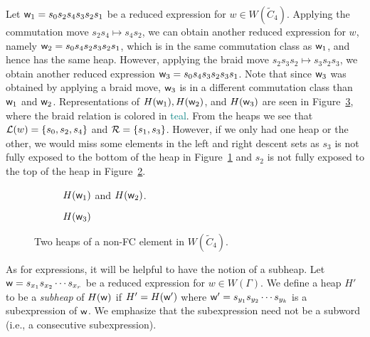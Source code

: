 \begin{example}
Let $\mathsf{w}_1=s_0s_2s_4s_3s_2s_1$ be a reduced expression for $w \in W(\widetilde{C}_4)$. Applying the commutation move $s_2s_4\mapsto s_4s_2$, we can obtain another reduced expression for $w$, namely $\mathsf{w}_2=s_0s_4s_2s_3s_2s_1$, which is in the same commutation class as $\mathsf{w}_1$, and hence has the same heap. However, applying the braid move $s_2s_3s_2 \mapsto s_3s_2s_3$, we obtain another reduced expression $\mathsf{w}_3=s_0s_4s_3s_2s_3s_1$. Note that since $\mathsf{w}_3$ was obtained by applying a braid move, $\mathsf{w}_3$ is in a different commutation class than $\mathsf{w}_1$ and $\mathsf{w}_2$. Representations of $H(\mathsf{w}_1), H(\mathsf{w}_2)$, and $H(\mathsf{w}_3)$ are seen in Figure~\ref{fig:not FC}, where the braid relation is colored in \textcolor{teal}{teal}. From the heaps we see that $\mathcal{L}(w)=\{s_0,s_2,s_4\}$ and $\mathcal{R}=\{s_1,s_3\}$. However, if we only had one heap or the other, we would miss some elements in the left and right descent sets as $s_3$ is not fully exposed to the bottom of the heap in Figure~\ref{fig:notFC2} and $s_2$ is not fully exposed to the top of the heap in Figure~\ref{fig:notFC3}. 

\begin{figure}[h]
\centering
\begin{subfigure}[b]{0.3\textwidth}	
\centering
{}
\caption{$H(\mathsf{w}_1)$ and $H(\mathsf{w}_2)$.}\label{fig:notFC2}
\end{subfigure}
\begin{subfigure}[b]{0.3\textwidth}	
\centering
{}
\caption{$H(\mathsf{w}_3)$}\label{fig:notFC3}
\end{subfigure}
\caption{Two heaps of a non-FC element in $W(\widetilde{C}_4)$.}	
\label{fig:not FC}
\end{figure}
\end{example}

As for expressions, it will be helpful to have the notion of a subheap. Let $\mathsf{w}=s_{x_1}s_{x_2} \cdots s_{x_r}$ be a reduced expression for $w \in W(\Gamma)$. We define a heap $H'$ to be a \emph{subheap} of $H(\mathsf{w})$ if $H'=H(\mathsf{w}')$ where $\mathsf{w}'=s_{y_1}s_{y_2} \cdots s_{y_k}$ is a subexpression of $\mathsf{w}$. We emphasize that the subexpression need not be a subword (i.e., a consecutive subexpression).

